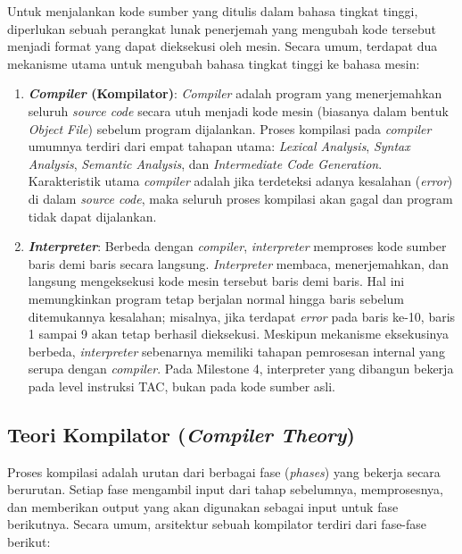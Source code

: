 \documentclass[12pt,a4paper]{article}
\begin{document}
Untuk menjalankan kode sumber yang ditulis dalam bahasa tingkat tinggi,
diperlukan sebuah perangkat lunak penerjemah yang mengubah kode tersebut menjadi
format yang dapat dieksekusi oleh mesin. Secara umum, terdapat dua mekanisme
utama untuk mengubah bahasa tingkat tinggi ke bahasa mesin:

\begin{enumerate}
    \item \textbf{\textit{Compiler} (Kompilator)}:
    \textit{Compiler} adalah program yang menerjemahkan seluruh \textit{source code}
    secara utuh menjadi kode mesin (biasanya dalam bentuk \textit{Object File})
    sebelum program dijalankan. Proses kompilasi pada \textit{compiler} umumnya
    terdiri dari empat tahapan utama: \textit{Lexical Analysis}, \textit{Syntax
    Analysis}, \textit{Semantic Analysis}, dan \textit{Intermediate Code
    Generation}. Karakteristik utama \textit{compiler} adalah jika terdeteksi adanya
    kesalahan (\textit{error}) di dalam \textit{source code}, maka seluruh proses
    kompilasi akan gagal dan program tidak dapat dijalankan.

    \item \textbf{\textit{Interpreter}}:
    Berbeda dengan \textit{compiler}, \textit{interpreter} memproses kode sumber
    baris demi baris secara langsung. \textit{Interpreter} membaca,
    menerjemahkan, dan langsung mengeksekusi kode mesin tersebut baris demi baris.
    Hal ini memungkinkan program tetap berjalan normal hingga baris sebelum
    ditemukannya kesalahan; misalnya, jika terdapat \textit{error} pada baris ke-10,
    baris 1 sampai 9 akan tetap berhasil dieksekusi. Meskipun mekanisme eksekusinya
    berbeda, \textit{interpreter} sebenarnya memiliki tahapan pemrosesan internal
    yang serupa dengan \textit{compiler}. Pada Milestone 4, interpreter yang
    dibangun bekerja pada level instruksi TAC, bukan pada kode sumber asli.
\end{enumerate}

\subsection{Teori Kompilator (\textit{Compiler Theory})}

Proses kompilasi adalah urutan dari berbagai fase (\textit{phases}) yang bekerja
secara berurutan. Setiap fase mengambil input dari tahap sebelumnya,
memprosesnya, dan memberikan output yang akan digunakan sebagai input untuk fase
berikutnya. Secara umum, arsitektur sebuah kompilator terdiri dari fase-fase
berikut:
\end{document}

